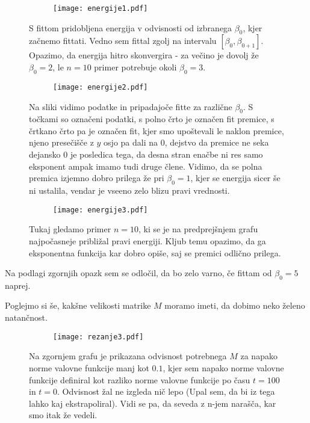 \documentclass{article}
\begin{document}
\begin{figure}[H]
\centering
\begin{subfigure}{.7\textwidth}
\texttt{[image: energije1.pdf]}
\end{subfigure}
\caption*{S fittom pridobljena energija v odvisnosti od izbranega $\beta_0$, kjer začnemo fittati. Vedno sem fittal zgolj na intervalu $[\beta_0, \beta_{0+1}]$. Opazimo, da energija hitro skonvergira - za večino je dovolj že $\beta_0=2$, le $n=10$ primer potrebuje okoli $\beta_0=3$.}
\end{figure}

\begin{figure}[H]
\centering
\begin{subfigure}{.8\textwidth}
\texttt{[image: energije2.pdf]}
\end{subfigure}
\caption*{Na sliki vidimo podatke in pripadajoče fitte za različne $\beta_0$. S točkami so označeni podatki, s polno črto je označen fit premice, s črtkano črto pa je označen fit, kjer smo upoštevali le naklon premice, njeno presečišče z $y$ osjo pa dali na $0$, dejstvo da premice ne seka dejansko $0$ je posledica tega, da desna stran enačbe ni res samo eksponent ampak imamo tudi druge člene. Vidimo, da se polna premica izjemno dobro prilega že pri $\beta_0 = 1$, kjer se energija sicer še ni ustalila, vendar je vseeno zelo blizu pravi vrednosti.}
\end{figure}

\begin{figure}[H]
\centering
\begin{subfigure}{.8\textwidth}
\texttt{[image: energije3.pdf]}
\end{subfigure}
\caption*{Tukaj gledamo primer $n=10$, ki se je na predprejšnjem grafu najpočasneje približal pravi energiji. Kljub temu opazimo, da ga eksponentna funkcija kar dobro opiše, saj se premici odlično prilega.}
\end{figure}
Na podlagi zgornjih opazk sem se odločil, da bo zelo varno, če fittam od $\beta_0 = 5$ naprej.


Poglejmo si še, kakšne velikosti matrike $M$ moramo imeti, da dobimo neko želeno natančnost.

\begin{figure}[H]
\centering
\begin{subfigure}{.8\textwidth}
\texttt{[image: rezanje3.pdf]}
\end{subfigure}
\caption*{Na zgornjem grafu je prikazana odvisnost potrebnega $M$ za napako norme valovne funkcije manj kot $0.1$, kjer sem napako norme valovne funkcije definiral  kot razliko norme valovne funkcije po času $t=100$ in $t=0$. Odvisnost žal ne izgleda nič lepo (Upal sem, da bi iz tega lahko kaj ekstrapoliral). Vidi se pa, da seveda z n-jem narašča, kar smo itak že vedeli.}
\end{figure}
\end{document}
